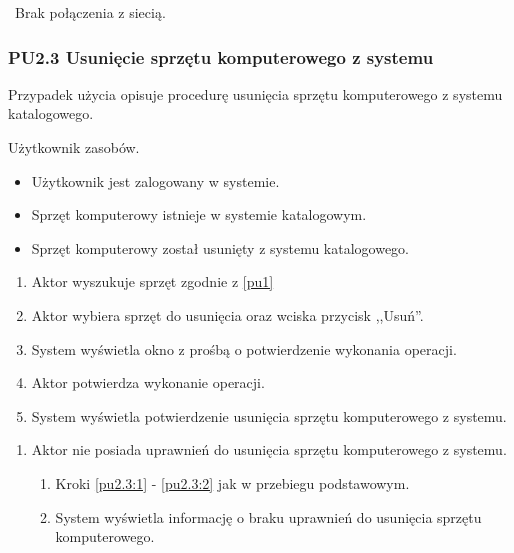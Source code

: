 \
Brak połączenia z siecią.

\subsubsection{PU2.3 Usunięcie sprzętu komputerowego z systemu}

Przypadek użycia opisuje procedurę usunięcia sprzętu komputerowego z systemu katalogowego.

Użytkownik zasobów.

\begin{itemize}
\item Użytkownik jest zalogowany w systemie.
\item Sprzęt komputerowy istnieje w systemie katalogowym.
\end{itemize}

\begin{itemize}
\item Sprzęt komputerowy został usunięty z systemu katalogowego.
\end{itemize}

\begin{enumerate}
\item \label{pu2.3:1} Aktor wyszukuje sprzęt zgodnie z \ref{pu1}
\item \label{pu2.3:2} Aktor wybiera sprzęt do usunięcia oraz wciska przycisk ,,Usuń''.
\item System wyświetla okno z prośbą o potwierdzenie wykonania operacji.
\item Aktor potwierdza wykonanie operacji.
\item System wyświetla potwierdzenie usunięcia sprzętu komputerowego z systemu.
\end{enumerate}

\begin{enumerate}
\item Aktor nie posiada uprawnień do usunięcia sprzętu komputerowego z systemu.
	\begin{enumerate}[label*=\arabic*.]
		\item Kroki \ref{pu2.3:1} - \ref{pu2.3:2} jak w przebiegu podstawowym.
		\item System wyświetla informację o braku uprawnień do usunięcia sprzętu komputerowego.
	\end{enumerate}
\end{enumerate}

